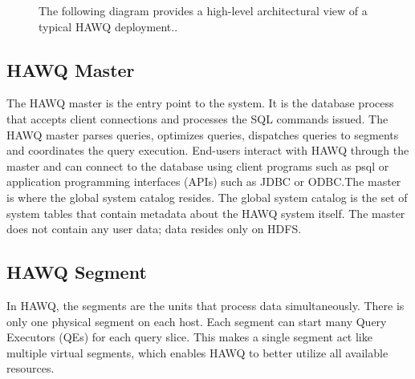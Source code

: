 \documentclass[9pt,twocolumn,twoside]{../../styles/osajnl}
\begin{document}
\begin{figure}[htbp]
	\centering
	\caption{{The following diagram provides a high-level 
	architectural view of a typical HAWQ 
	deployment.}\cite{www-hawq-arch-image}.}
	\label{fig:false-color}
\end{figure}

\subsection{HAWQ Master}

The HAWQ master is the entry point to the system. It is the database 
process that accepts client connections and processes the SQL 
commands issued. The HAWQ master parses queries, optimizes queries, 
dispatches queries to segments and coordinates the query execution.
End-users interact with HAWQ through the master and can connect to 
the database using client programs such as psql or application 
programming interfaces (APIs) such as {JDBC}\cite{www-jdbc} or 
{ODBC}\cite{www-odbc}.The master is 
where the global system catalog resides. The global system catalog is 
the set of system tables that contain metadata about the HAWQ system 
itself. The master does not contain any user data; data resides only 
on HDFS. 

\subsection{HAWQ Segment}

In HAWQ, the segments are the units that process data simultaneously. 
There is only one physical segment on each host. Each segment can 
start many Query Executors (QEs) for each query slice. This makes a 
single segment act like multiple virtual segments, which enables HAWQ 
to better utilize all available resources.
\end{document}
